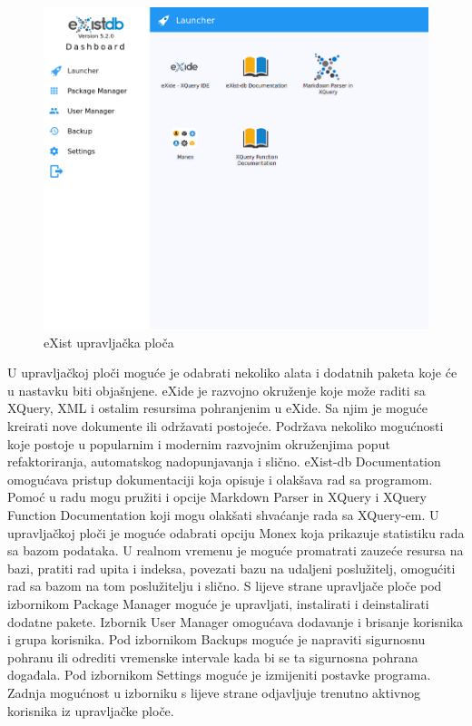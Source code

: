 \documentclass{foi}
\begin{document}
\begin{figure}[h!]
    \centering
    \includegraphics[width=1\textwidth]{slike/exist-dashboard.png}
    \caption{eXist upravljačka ploča}
    \label{exist-dashboard}
\end{figure}

U upravljačkoj ploči moguće je odabrati nekoliko alata i dodatnih paketa koje će u nastavku biti objašnjene. eXide je razvojno okruženje koje može raditi sa XQuery, XML i ostalim resursima pohranjenim u eXide. Sa njim je moguće kreirati nove dokumente ili održavati postojeće. Podržava nekoliko mogućnosti koje postoje u popularnim i modernim razvojnim okruženjima poput refaktoriranja, automatskog nadopunjavanja i slično. eXist-db Documentation omogućava pristup dokumentaciji koja opisuje i olakšava rad sa programom. Pomoć u radu mogu pružiti i opcije Markdown Parser in XQuery i XQuery Function Documentation koji mogu olakšati shvaćanje rada sa XQuery-em. U upravljačkoj ploči je moguće odabrati opciju Monex koja prikazuje statistiku rada sa bazom podataka. U realnom vremenu je moguće promatrati zauzeće resursa na bazi, pratiti rad upita i indeksa, povezati bazu na udaljeni poslužitelj, omogućiti rad sa bazom na tom poslužitelju i slično. S lijeve strane upravljače ploče pod izbornikom Package Manager moguće je upravljati, instalirati i deinstalirati dodatne pakete. Izbornik User Manager omogućava dodavanje i brisanje korisnika i grupa korisnika. Pod izbornikom Backups moguće je napraviti sigurnosnu pohranu ili odrediti vremenske intervale kada bi se ta sigurnosna pohrana događala. Pod izbornikom Settings moguće je izmijeniti postavke programa. Zadnja mogućnost u izborniku s lijeve strane odjavljuje trenutno aktivnog korisnika iz upravljačke ploče.
\end{document}
